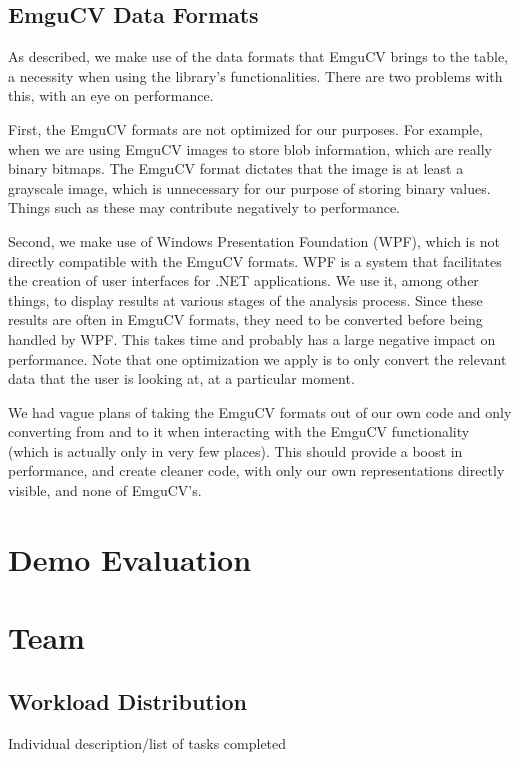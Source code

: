 \documentclass[10pt,twocolumn]{scrartcl}
\begin{document}
\subsection{EmguCV Data Formats}
\label{sec:emgucvFormats}
As described, we make use of the data formats that EmguCV brings to the table, a necessity when using the library's functionalities. There are two problems with this, with an eye on performance.

First, the EmguCV formats are not optimized for our purposes. For example, when we are using EmguCV images to store blob information, which are really binary bitmaps. The EmguCV format dictates that the image is at least a grayscale image, which is unnecessary for our purpose of storing binary values. Things such as these may contribute negatively to performance.

Second, we make use of Windows Presentation Foundation (WPF), which is not directly compatible with the EmguCV formats. WPF is a system that facilitates the creation of user interfaces for .NET applications. We use it, among other things, to display results at various stages of the analysis process. Since these results are often in EmguCV formats, they need to be converted before being handled by WPF. This takes time and probably has a large negative impact on performance. Note that one optimization we apply is to only convert the relevant data that the user is looking at, at a particular moment.

We had vague plans of taking the EmguCV formats out of our own code and only converting from and to it when interacting with the EmguCV functionality (which is actually only in very few places). This should provide a boost in performance, and create cleaner code, with only our own representations directly visible, and none of EmguCV's.

\section{Demo Evaluation}

\section{Team}

\subsection{Workload Distribution}
Individual description/list of tasks completed 
\end{document}
